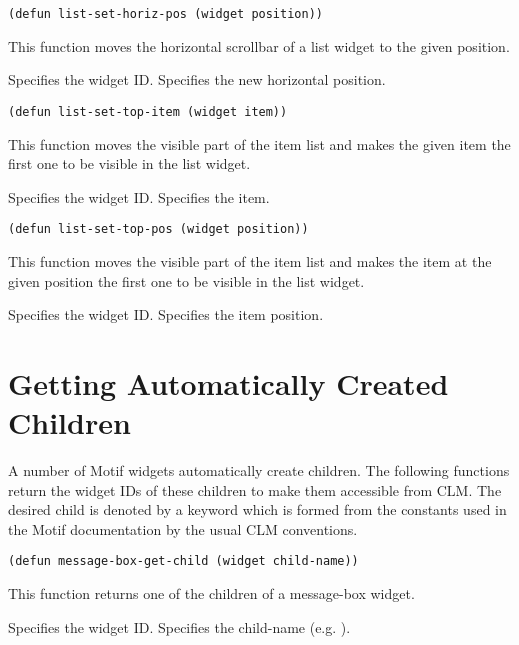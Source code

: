 \begin{lispd}
\syntax\begin{verbatim}
(defun list-set-horiz-pos (widget position))
\end{verbatim}
\beschr This function moves the horizontal scrollbar of a list widget to the 
given position.
\parameter
\begin{paramd}
 Specifies the widget ID.
 Specifies the new horizontal position.
\end{paramd}
\end{lispd}

\begin{lispd}
\syntax\begin{verbatim}
(defun list-set-top-item (widget item))
\end{verbatim}
\beschr This function moves the visible part of the item list and makes the 
given item the first one to be visible in the list widget.
\parameter
\begin{paramd}
  Specifies the widget ID.
 Specifies the item.
\end{paramd}
\end{lispd}

\begin{lispd}
\syntax\begin{verbatim}
(defun list-set-top-pos (widget position))
\end{verbatim}
\beschr This function moves the visible part of the item list and makes the
item at the given position the first one to be visible in the list widget.
\parameter
\begin{paramd}
  Specifies the widget ID.
 Specifies the item position.
\end{paramd}
\end{lispd}

\section{Getting Automatically Created Children}

A number of Motif widgets automatically create children. The following functions
return the widget IDs of these children to make them accessible from CLM.
The desired child is denoted by a keyword which is formed from the constants
used in the Motif documentation by the usual CLM conventions.

\begin{lispd}
\syntax\begin{verbatim}
(defun message-box-get-child (widget child-name))
\end{verbatim}
\beschr This function returns one of the children of a message-box widget.
\parameter
\begin{paramd}
  Specifies the widget ID.
 Specifies the child-name (e.g. ).
\end{paramd}
\end{lispd}

